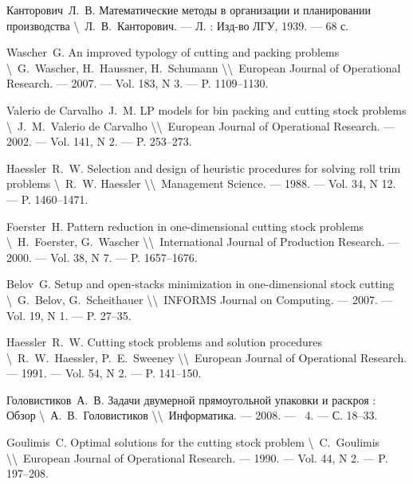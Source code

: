 \documentclass[12pt]{article}
\begin{document}
\begin{thebibliography}{00}
 Канторович~Л.~В. Математические методы в 
организации и планировании производства 
\textbackslash~Л.~В.~Канторович. --- Л. : Изд-во ЛГУ, 1939. --- 68 с.    

 Wascher~G. An improved typology of cutting and packing 
problems 
\textbackslash~G.~Wascher, H.~Haussner, H.~Schumann 
\textbackslash\textbackslash~European Journal of Operational Research. 
--- 2007. --- Vol. 183, N 3. --- P. 1109--1130.

 Valerio de Carvalho~J.~M. LP models for bin packing 
and cutting stock problems
\textbackslash~J.~M.~Valerio de Carvalho 
\textbackslash\textbackslash~European Journal of Operational Research. 
--- 2002. --- Vol. 141, N 2. --- P. 253--273.

 Haessler~R.~W. Selection and design of heuristic 
procedures for solving roll trim problems 
\textbackslash~R.~W. Haessler 
\textbackslash\textbackslash~Management Science. 
--- 1988. --- Vol. 34, N 12. --- P. 1460--1471.

 Foerster~H. Pattern reduction in one-dimensional 
cutting stock problems 
\textbackslash~H.~Foerster, G.~Wascher 
\textbackslash\textbackslash~International Journal of Production Research. 
--- 2000. --- Vol. 38, N 7. --- P. 1657--1676.

 Belov~G. Setup and open-stacks minimization in 
one-dimensional stock cutting 
\textbackslash~G.~Belov, G.~Scheithauer 
\textbackslash\textbackslash~INFORMS Journal on Computing. 
--- 2007. --- Vol. 19, N 1. --- P. 27--35.

 Haessler~R.~W. Cutting stock problems and solution 
procedures 
\textbackslash~R.~W.~Haessler, P.~E.~Sweeney 
\textbackslash\textbackslash~European Journal of Operational Research. 
--- 1991. --- Vol. 54, N 2. --- P. 141--150.

 Головистиков~А.~В. Задачи двумерной прямоугольной 
упаковки и раскроя : Обзор 
\textbackslash~А.~В.~Головистиков 
\textbackslash\textbackslash~Информатика. --- 2008. --- \No~4. --- С. 18--33.

 Goulimis~C. Optimal solutions for the cutting stock 
problem 
\textbackslash~C.~Goulimis 
\textbackslash\textbackslash~European Journal of Operational Research. 
--- 1990. --- Vol. 44, N 2. --- P. 197--208.


\end{thebibliography}
\end{document}
